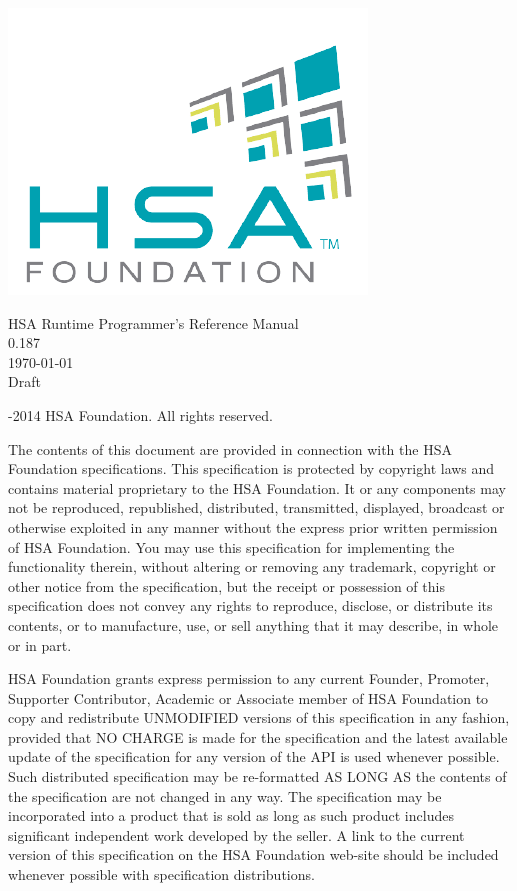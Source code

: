 \documentclass[final]{book}
\newcommand{\doctitle}{HSA Runtime Programmer's Reference Manual}
\newcommand{\docversion}{0.187}
\begin{document}
\begin{titlepage}
\includegraphics[width=.4\textwidth]{fig/foundation_small.png}
\vspace*{7cm}
\begin{center}
{\Large \doctitle\\[1ex]\large\docversion}\\
\vspace*{1cm}
\vspace*{0.5cm}
{\small \today}\\
\vspace*{0.5cm}
{\small Draft}\\
\end{center}
\end{titlepage}
\thispagestyle{empty} {-2014 HSA Foundation. All rights
  reserved.}


The contents of this document are provided in connection with the HSA Foundation
specifications. This specification is protected by copyright laws and contains
material proprietary to the HSA Foundation. It or any components may not be
reproduced, republished, distributed, transmitted, displayed, broadcast or
otherwise exploited in any manner without the express prior written permission
of HSA Foundation. You may use this specification for implementing the
functionality therein, without altering or removing any trademark, copyright or
other notice from the specification, but the receipt or possession of this
specification does not convey any rights to reproduce, disclose, or distribute
its contents, or to manufacture, use, or sell anything that it may describe, in
whole or in part.

HSA Foundation grants express permission to any current Founder, Promoter,
Supporter Contributor, Academic or Associate member of HSA Foundation to copy
and redistribute UNMODIFIED versions of this specification in any fashion,
provided that NO CHARGE is made for the specification and the latest available
update of the specification for any version of the API is used whenever
possible. Such distributed specification may be re-formatted AS LONG AS the
contents of the specification are not changed in any way. The specification may
be incorporated into a product that is sold as long as such product includes
significant independent work developed by the seller. A link to the current
version of this specification on the HSA Foundation web-site should be included
whenever possible with specification distributions.
\end{document}
